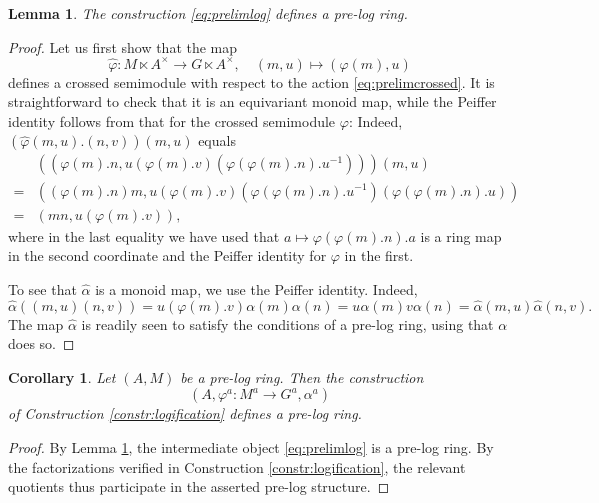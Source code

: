 \documentclass[a4paper,10pt%
]{amsart}
\numberwithin{equation}{section}
\newtheorem{corollary}[subsection]{Corollary}
\newtheorem{lemma}[subsection]{Lemma}
\theoremstyle{definition}
\renewcommand{\:}{\colon}
\begin{document}
\begin{lemma}\label{lem:logiprelim} The construction \eqref{eq:prelimlog} defines a pre-log ring. 
\end{lemma}

\begin{proof} Let us first show that the map \[\hat{\varphi} \colon M \ltimes A^\times \to G \ltimes A^\times, \quad (m, u) \mapsto (\varphi(m), u)\] defines a crossed semimodule with respect to the action \eqref{eq:prelimcrossed}. It is straightforward to check that it is an equivariant monoid map, while the Peiffer identity follows from that for the crossed semimodule $\varphi$: Indeed, $(\hat{\varphi}(m, u).(n, v))(m, u)$ equals \begin{align*} & ((\varphi(m).n, u(\varphi(m).v)(\varphi(\varphi(m).n).u^{-1})))(m, u) \\ =  & ((\varphi(m).n)m, u(\varphi(m).v)(\varphi(\varphi(m).n).u^{-1})(\varphi(\varphi(m).n).u)) \\ = &  (mn, u(\varphi(m).v)),\end{align*} where in the last equality we have used that $a \mapsto \varphi(\varphi(m).n).a$ is a ring map in the second coordinate and the Peiffer identity for $\varphi$ in the first. 

To see that $\hat{\alpha}$ is a monoid map, we use the Peiffer identity. Indeed, \[\hat{\alpha}((m, u)(n, v)) = u(\varphi(m).v)\alpha(m)\alpha(n) = u\alpha(m)v\alpha(n) = \hat{\alpha}(m, u)\hat{\alpha}(n, v).\] The map $\hat{\alpha}$ is readily seen to satisfy the conditions of a pre-log ring, using that $\alpha$ does so. 
\end{proof}

\begin{corollary} Let $(A, M)$ be a pre-log ring. Then the construction \[(A, \varphi^a \colon M^a \to G^a, \alpha^a)\] of Construction \ref{constr:logification} defines a pre-log ring. 
\end{corollary}

\begin{proof} By Lemma \ref{lem:logiprelim}, the intermediate object \eqref{eq:prelimlog} is a pre-log ring. By the factorizations verified in Construction \ref{constr:logification}, the relevant quotients thus participate in the asserted pre-log structure. 
\end{proof}
\end{document}

